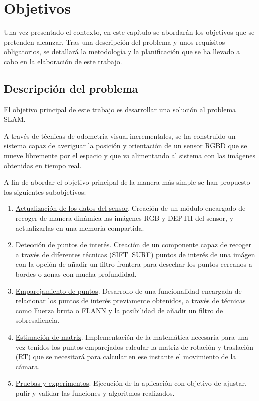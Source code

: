 \chapter{Objetivos}

\label{Chapter2} %

Una vez presentado el contexto, en este capítulo se abordarán los objetivos que se pretenden alcanzar. Tras una descripción del problema y unos requisitos obligatorios, se detallará la metodología y la planificación que se ha llevado a cabo en la elaboración de este trabajo.

\section{Descripción del problema}

El objetivo principal de este trabajo es desarrollar una solución al problema SLAM.

A través de técnicas de odometría visual incrementales, se ha construido un sistema capaz de averiguar la posición y orientación de un sensor RGBD que se mueve libremente por el espacio y que va alimentando al sistema con las imágenes obtenidas en tiempo real.

A fin de abordar el objetivo principal de la manera más simple se han propuesto los siguientes subobjetivos:

\begin{enumerate}
\item \underline{Actualización de los datos del sensor}.
Creación de un módulo encargado de recoger de manera dinámica las imágenes RGB y DEPTH del sensor, y actualizarlas en una memoria compartida.
 
\item \underline{Detección de puntos de interés}.
Creación de un componente capaz de recoger a través de diferentes técnicas (SIFT, SURF) puntos de interés de una imágen con la opción de añadir un filtro frontera para desechar los puntos cercanos a bordes o zonas con mucha profundidad.

\item \underline{Emparejamiento de puntos}.
Desarrollo de una funcionalidad encargada de relacionar los puntos de interés previamente obtenidos, a través de técnicas como Fuerza bruta o FLANN y la posibilidad de añadir un filtro de sobresaliencia.

\item \underline{Estimación de matriz}.
Implementación de la matemática necesaria para una vez tenidos los puntos emparejados calcular la matriz de rotación y traslación (RT) que se necesitará para calcular en ese instante el movimiento de la cámara.

\item \underline{Pruebas y experimentos}.
Ejecución de la aplicación con objetivo de ajustar, pulir y validar las funciones y algoritmos realizados.

\end{enumerate}

